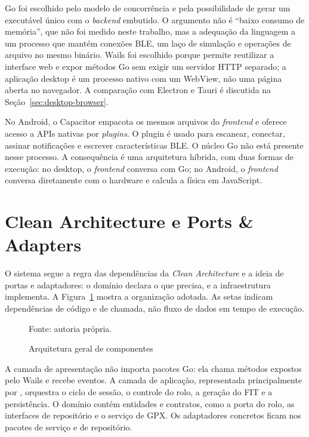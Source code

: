 Go foi escolhido pelo modelo de concorrência e pela possibilidade de gerar um
executável único com o \textit{backend} embutido. O argumento não é ``baixo
consumo de memória'', que não foi medido neste trabalho, mas a adequação da
linguagem a um processo que mantém conexões BLE, um laço de simulação e
operações de arquivo no mesmo binário. Wails foi escolhido porque permite
reutilizar a interface web e expor métodos Go sem exigir um servidor HTTP
separado; a aplicação desktop é um processo nativo com um WebView, não uma
página aberta no navegador. A comparação com Electron e Tauri é discutida na
Seção~\ref{sec:desktop-browser}.

No Android, o Capacitor empacota os mesmos arquivos do \textit{frontend} e
oferece acesso a APIs nativas por \textit{plugins}. O plugin
 é usado para escanear, conectar,
assinar notificações e escrever características BLE. O núcleo Go não está
presente nesse processo. A consequência é uma arquitetura híbrida, com duas
formas de execução: no desktop, o \textit{frontend} conversa com Go; no
Android, o \textit{frontend} conversa diretamente com o hardware e calcula a
física em JavaScript.

\section{Clean Architecture e Ports \& Adapters}
\label{sec:principios}

O sistema segue a regra das dependências da \textit{Clean Architecture}
\cite{martin2017clean} e a ideia de portas e adaptadores: o domínio declara o
que precisa, e a infraestrutura implementa. A Figura~\ref{fig:arquitetura}
mostra a organização adotada. As setas indicam dependências de código e de
chamada, não fluxo de dados em tempo de execução.

\begin{figure}[htbp]
    \centering
    \caption{Arquitetura geral de componentes}
    \label{fig:arquitetura}
    \resizebox{\textwidth}{!}{}
    \vspace{0.1cm}
    \par\small Fonte: autoria própria.
\end{figure}

A camada de apresentação não importa pacotes Go: ela chama métodos expostos
pelo Wails e recebe eventos. A camada de aplicação, representada principalmente
por , orquestra o ciclo de sessão, o controle do rolo, a
geração do FIT e a persistência. O domínio contém entidades e contratos, como
a porta do rolo, as interfaces de repositório e o serviço de GPX. Os
adaptadores concretos ficam nos pacotes de serviço e de repositório.

